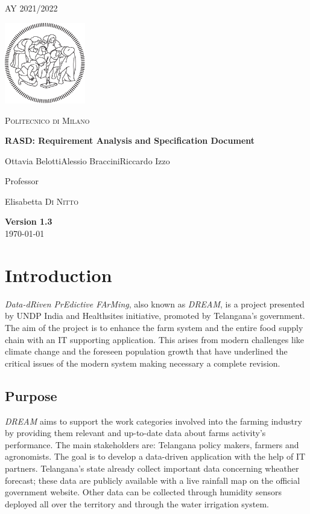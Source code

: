 \documentclass[table, 12pt]{article}
\begin{document}
\begin{titlepage}
    \centering
    {\scshape\large AY 2021/2022 \par}
    \vfill
    \includegraphics[width=100pt]{assets/logo-polimi-new}\par\vspace{1cm}
    {\scshape\LARGE Politecnico di Milano \par}
    \vspace{1.5cm}
    {\huge\bfseries RASD\@: Requirement Analysis
        and Specification Document \par}
    \vspace{2cm}
    {\Large {Ottavia Belotti\quad Alessio Braccini\quad Riccardo Izzo}\par}
    \vfill
    {\large Professor\par
        Elisabetta \textsc{Di Nitto}}
    \vfill
    {\large \textbf{Version 1.3}\\ \today \par}
\end{titlepage}


\thispagestyle{plain}
\mbox{}
\newpage
{}
\tableofcontents
\newpage
{}

\section{Introduction}
\emph{Data-dRiven PrEdictive FArMing}, also known as \emph{DREAM}, is a project presented by UNDP India and Healthsites initiative, promoted by Telangana's government.
The aim of the project is to enhance the farm system and the entire food supply chain with an IT supporting application. 
This arises from modern challenges like climate change and the foreseen population growth that have underlined the critical issues of the modern system making necessary a complete revision.


\subsection{Purpose} %
\emph{DREAM} aims to support the work categories involved into the farming industry by providing them relevant and up-to-date data about farms activity's performance. 
The main stakeholders are: Telangana policy makers, farmers and agronomists.
The goal is to develop a data-driven application with the help of IT partners.
Telangana's state already collect important data concerning wheather forecast; these data are publicly available with a live rainfall map on the official government website.
Other data can be collected through humidity sensors deployed all over the territory and through the water irrigation system.
\end{document}
